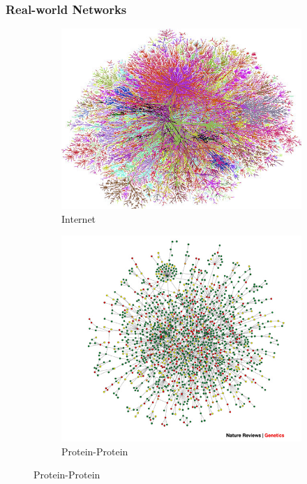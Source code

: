\documentclass{beamer}
\begin{document}
\begin{frame}
	\frametitle{Real-world Networks}
	\begin{figure}[!h]
		\centering
		\begin{subfigure}[b]{0.3\textwidth}
			\includegraphics[width=\textwidth]{images/Steve-Jurvetson.jpg}
			\caption{Internet}
		\end{subfigure}\qquad
		\begin{subfigure}[b]{0.3\textwidth}
			\includegraphics[width= \textwidth]{images/yeastprotein-protein-interactions.jpeg}
			\caption{Protein-Protein }

\end{subfigure}
\end{figure}
\end{frame}
\end{document}
